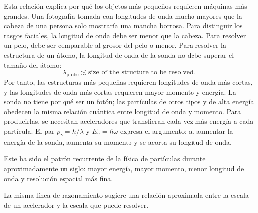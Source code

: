 Esta relación explica por qué los objetos más pequeños requieren máquinas más grandes. Una fotografía tomada con longitudes de onda mucho mayores que la cabeza de una persona solo mostraría una mancha borrosa. Para distinguir los rasgos faciales, la longitud de onda debe ser menor que la cabeza. Para resolver un pelo, debe ser comparable al grosor del pelo o menor. Para resolver la estructura de un átomo, la longitud de onda de la sonda no debe superar el tamaño del átomo:
\begin{equation}
\lambda_{\mathrm{probe}}\lesssim
\text{size of the structure to be resolved}.
\end{equation}
Por tanto, las estructuras más pequeñas requieren longitudes de onda más cortas, y las longitudes de onda más cortas requieren mayor momento y energía. La sonda no tiene por qué ser un fotón; las partículas de otros tipos y de alta energía obedecen la misma relación cuántica entre longitud de onda y momento. Para producirlas, se necesitan aceleradores que transfieran cada vez más energía a cada partícula. El par \(p_\gamma=h/\lambda\) y \(E_\gamma=\hbar\omega\) expresa el argumento: al aumentar la energía de la sonda, aumenta su momento y se acorta su longitud de onda.

Este ha sido el patrón recurrente de la física de partículas durante aproximadamente un siglo: mayor energía, mayor momento, menor longitud de onda y resolución espacial más fina.

\begin{classroomqa}
\end{classroomqa}

La misma línea de razonamiento sugiere una relación aproximada entre la escala de un acelerador y la escala que puede resolver.

